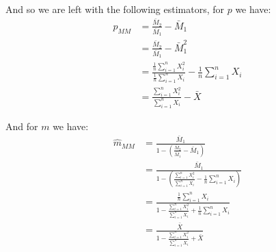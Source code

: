 \documentclass{article}
\begin{document}
And so we are left with the following estimators, for $p$ we have:
\begin{align*}
    \hat p_{MM}&=\frac{\bar M_2}{\bar M_1}-\bar M_1\tag{method of moments}\\
    &=\frac{\bar M_2}{\bar M_1}-\bar M_1^2\\
    &=\frac{\frac{1}{n}\sum_{i=1}^nX_i^2}{\frac{1}{n}\sum_{i=1}^nX_i}-\frac{1}{n}\sum_{i=1}^nX_i\\
    &=\frac{\sum_{i=1}^nX_i^2}{\sum_{i=1}^nX_i}-\bar X
\end{align*}

And for $m$ we have:
\begin{align*}
    \hat m_{MM}&=\frac{\bar M_1}{1-\left(\frac{\bar M_2}{\bar M_1}-\bar M_1\right)}\tag{method of moments}\\
    &=\frac{\bar M_1}{1-\left(\frac{\sum_{i=1}^nX_i^2}{\sum_{i=1}^nX_i}-\frac{1}{n}\sum_{i=1}^nX_i\right)}\tag{from above derivation}\\
    &=\frac{\frac{1}{n}\sum_{i=1}^nX_i}{1-\frac{\sum_{i=1}^nX_i^2}{\sum_{i=1}^nX_i}+\frac{1}{n}\sum_{i=1}^nX_i}\\
    &=\frac{\bar X}{1-\frac{\sum_{i=1}^nX_i^2}{\sum_{i=1}^nX_i}+\bar X}\tag{def. of sample mean}
\end{align*}
\end{document}
